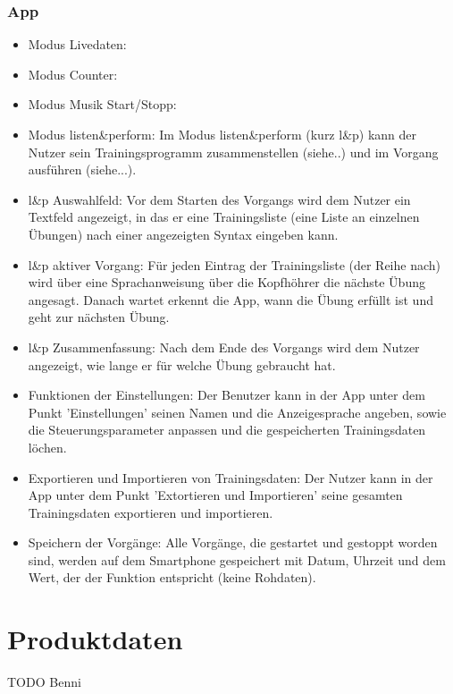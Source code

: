 \documentclass[a4paper,12pt]{article}
\begin{document}
    \subsubsection{App}
    \begin{itemize}
      
      \item[] \textsf{Modus Livedaten:}
      \item[] \textsf{Modus Counter:}
      \item[] \textsf{Modus Musik Start/Stopp:}
      \item[] \textsf{Modus listen\&perform:} Im Modus listen\&perform (kurz l\&p) kann der Nutzer sein Trainingsprogramm zusammenstellen (siehe..) und im Vorgang ausführen (siehe...). 
      \item[] \textsf{l\&p Auswahlfeld:} Vor dem Starten des Vorgangs wird dem Nutzer ein Textfeld angezeigt, in das er eine Trainingsliste (eine Liste an einzelnen Übungen) nach einer angezeigten Syntax eingeben kann.
      \item[] \textsf{l\&p aktiver Vorgang:} Für jeden Eintrag der Trainingsliste (der Reihe nach) wird über eine Sprachanweisung über die Kopfhöhrer die nächste Übung angesagt. Danach wartet erkennt die App, wann die Übung erfüllt ist und geht zur nächsten Übung.
      \item[] \textsf{l\&p Zusammenfassung:} Nach dem Ende des Vorgangs wird dem Nutzer angezeigt, wie lange er für welche Übung gebraucht hat.
      \item[] \textsf{Funktionen der Einstellungen:} Der Benutzer kann in der App unter dem Punkt 'Einstellungen' seinen Namen und die Anzeigesprache angeben, sowie die Steuerungsparameter anpassen und die gespeicherten Trainingsdaten löchen.
      \item[] \textsf{Exportieren und Importieren von Trainingsdaten:} Der Nutzer kann in der App unter dem Punkt 'Extortieren und Importieren' seine gesamten Trainingsdaten exportieren und importieren.
      \item[] \textsf{Speichern der Vorgänge:} Alle Vorgänge, die gestartet und gestoppt worden sind, werden auf dem Smartphone gespeichert mit Datum, Uhrzeit und dem Wert, der der Funktion entspricht (keine Rohdaten).   
    \end{itemize}


\section{Produktdaten}
TODO Benni
\end{document}
